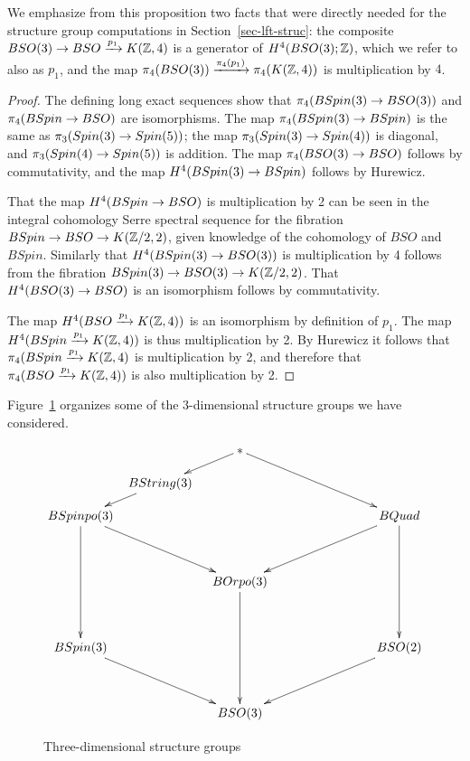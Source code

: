 \documentclass{amsart}
\begin{document}
We emphasize from this proposition two facts that were directly needed for the structure group computations in Section~\ref{sec-lft-struc}: the composite $BSO(3) \rightarrow BSO \xrightarrow{p_1} K(\mathbb Z,4)$ is a generator of $H^4(BSO(3);\mathbb Z)$, which we refer to also as $p_1$, and the map $\pi_4(BSO(3)) \xrightarrow{\pi_4(p_1)} \pi_4(K(\mathbb Z,4))$ is multiplication by $4$.

\begin{proof}
The defining long exact sequences show that $\pi_4(BSpin(3) \rightarrow BSO(3))$ and $\pi_4(BSpin \rightarrow BSO)$ are isomorphisms.  The map $\pi_4(BSpin(3) \rightarrow BSpin)$ is the same as $\pi_3(Spin(3) \rightarrow Spin(5))$; the map $\pi_3(Spin(3) \rightarrow Spin(4))$ is diagonal, and $\pi_3(Spin(4) \rightarrow Spin(5))$ is addition. %
The map $\pi_4(BSO(3) \rightarrow BSO)$ follows by commutativity, and the map $H^4(BSpin(3) \rightarrow BSpin)$ follows by Hurewicz.

That the map $H^4(BSpin \rightarrow BSO)$ is multiplication by 2 can be seen in the integral cohomology Serre spectral sequence for the fibration $BSpin \rightarrow BSO \rightarrow K(\mathbb Z/2,2)$, given knowledge of the cohomology of $BSO$ and $BSpin$.  Similarly that $H^4(BSpin(3) \rightarrow BSO(3))$ is multiplication by 4 follows from the fibration $BSpin(3) \rightarrow BSO(3) \rightarrow K(\mathbb Z/2,2)$.  That $H^4(BSO(3) \rightarrow BSO)$ is an isomorphism follows by commutativity.

The map $H^4(BSO \xrightarrow{p_1} K(\mathbb Z,4))$ is an isomorphism by definition of $p_1$.  The map $H^4(BSpin \xrightarrow{p_1} K(\mathbb Z,4))$ is thus multiplication by 2.  By Hurewicz it follows that $\pi_4(BSpin \xrightarrow{p_1} K(\mathbb Z,4)$ is multiplication by 2, and therefore that $\pi_4(BSO \xrightarrow{p_1} K(\mathbb Z,4))$ is also multiplication by 2.
\end{proof}


Figure~\ref{fig-structuregroups} organizes some of the 3-dimensional structure groups we have considered.
\begin{figure}[!ht]
\begin{equation} \nn
\xymatrix@!R@!C@R=10pt@C=5pt{
&& \ast \ar[dl] \ar[ddrr] && \\
& BString(3) \ar[dl] &&& \\
BSpinpo(3) \ar[ddrr] \ar[dddd] &&&& BQuad \ar[ddll] \ar[dddd] \\
&&&& \\
&& BOrpo(3) \ar[dddd] && \\
&&&& \\
BSpin(3) \ar[ddrr] &&&& BSO(2) \ar[ddll] \\
&&&& \\
&& BSO(3) &&
}
\end{equation}
\caption{Three-dimensional structure groups} \label{fig-structuregroups}
\end{figure}
\end{document}
